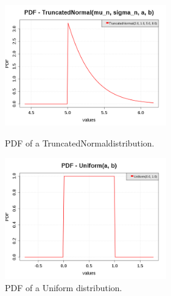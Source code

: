 \begin{figure}[H]
  \begin{minipage}{10cm}
    \begin{center}
      \includegraphics[width=7cm]{pdf_TruncatedNormal_4.png}
      \caption{PDF of a  TruncatedNormaldistribution.}
      \label{PDFTruncatedNormal4}
    \end{center}
  \end{minipage}
  \hfill
  \begin{minipage}{10cm}
    \begin{center}
      \includegraphics[width=7cm]{pdf_Uniform.png}
      \caption{PDF of a  Uniform distribution.}
      \label{PDFUniform}
    \end{center}
  \end{minipage}
\end{figure}




